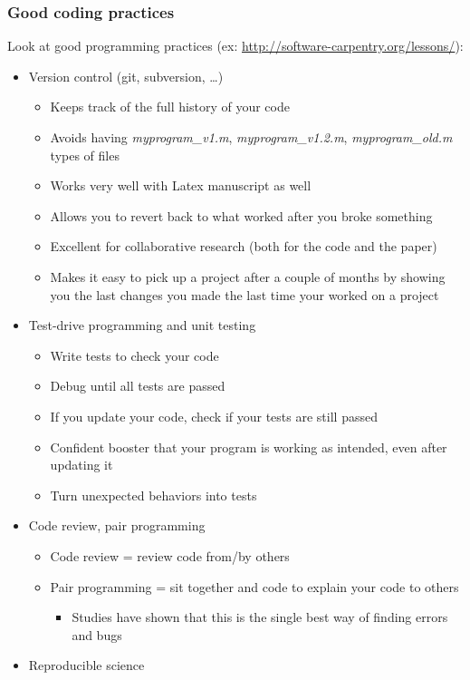 \documentclass[screen, aspectratio=43]{beamer}
\begin{document}
\begin{frame}
  \frametitle{Good coding practices}
Look at good programming practices (ex: \url{http://software-carpentry.org/lessons/}):
\begin{itemize}
\item Version control (git, subversion, \ldots)
  \begin{itemize}[<only@1>]
  \item Keeps track of the full history of your code
  \item Avoids having \emph{myprogram\_v1.m}, \emph{myprogram\_v1.2.m}, \emph{myprogram\_old.m} types of files
  \item Works very well with Latex manuscript as well
  \item Allows you to revert back to what worked after you broke something
  \item Excellent for collaborative research (both for the code and the paper)
  \item Makes it easy to pick up a project after a couple of months by showing you the last changes you made the last time your worked on a project
  \end{itemize}
\item Test-drive programming and unit testing
  \begin{itemize}[<only@2>]
  \item Write tests to check your code
  \item Debug until all tests are passed
  \item If you update your code, check if your tests are still passed
  \item Confident booster that your program is working as intended, even after updating it
  \item Turn unexpected behaviors into tests
  \end{itemize}
\item Code review, pair programming
  \begin{itemize}[<only@3>]
  \item Code review = review code from/by others
  \item Pair programming = sit together and code to explain your code to others
    \begin{itemize}
    \item Studies have shown that this is the single best way of finding errors and bugs
    \end{itemize}
  \end{itemize}
\item Reproducible science

\end{itemize}
\end{frame}
\end{document}
